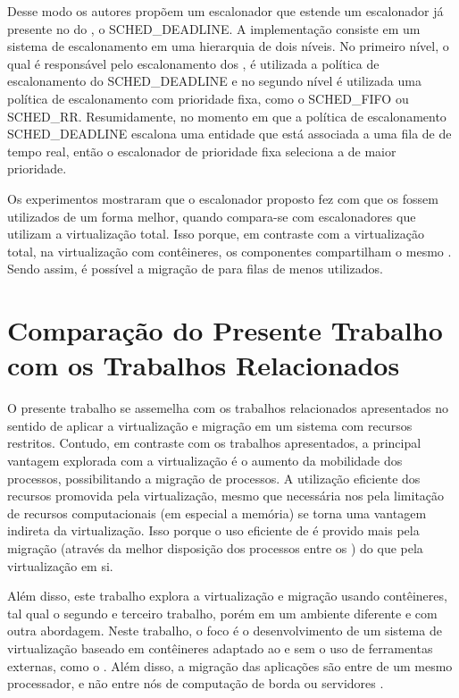 Desse modo os autores propõem um escalonador que estende um escalonador já presente no  do \linux, o SCHED\_DEADLINE. A implementação consiste em um sistema de escalonamento em uma hierarquia de dois níveis. No primeiro nível, o qual é responsável pelo escalonamento dos \cgroups, é utilizada a política de escalonamento do SCHED\_DEADLINE e no segundo nível é utilizada uma política de escalonamento com prioridade fixa, como o SCHED\_FIFO ou SCHED\_RR.
Resumidamente, no momento em que a política de escalonamento SCHED\_DEADLINE escalona uma entidade que está associada a uma fila de \tasks de tempo real, então o escalonador de prioridade fixa seleciona a \task de maior prioridade.

Os experimentos mostraram que o escalonador proposto fez com que os \cores fossem utilizados de um forma melhor, quando compara-se com escalonadores que utilizam a virtualização total. Isso porque, em contraste com a virtualização total, na virtualização com contêineres, os componentes compartilham o mesmo . Sendo assim, é possível a migração de \tasks para filas de \cores menos utilizados.

\section{Comparação do Presente Trabalho com os Trabalhos Relacionados}

O presente trabalho se assemelha com os trabalhos relacionados apresentados no sentido de aplicar a virtualização e migração em um sistema com recursos restritos. Contudo, em contraste com os trabalhos apresentados, a principal vantagem explorada com a virtualização é o aumento da mobilidade dos processos, possibilitando a migração de processos. A utilização eficiente dos recursos promovida pela virtualização, mesmo que necessária nos \lws pela limitação de recursos computacionais (em especial a memória) se torna uma vantagem indireta da virtualização. Isso porque o uso eficiente de \hardware é provido mais pela migração (através da melhor disposição dos processos entre os \clusters) do que pela virtualização em si.

Além disso, este trabalho explora a virtualização e migração usando contêineres, tal qual o segundo e terceiro trabalho, porém em um ambiente diferente e com outra abordagem. Neste trabalho, o foco é o desenvolvimento de um sistema de virtualização baseado em contêineres adaptado ao \so e sem o uso de ferramentas externas, como o \docker. Além disso, a migração das aplicações são entre \clusters de um mesmo processador, e não entre nós de computação de borda ou servidores \cloud.



